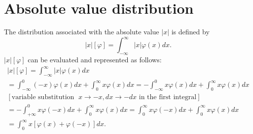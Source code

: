 %



\section{Absolute value distribution}


The distribution associated with the absolute value $\left|x\right|$ is defined by
 \begin{equation}
\left|x\right| \left[ \varphi \right] =
\int_{-\infty}^\infty  \left|x\right|  \varphi(x) dx.
 \end{equation}
$\left|x\right| \left[ \varphi \right]$
can be evaluated and represented as follows:
\begin{equation}
\begin{split}
\left|x\right| \left[ \varphi \right]
=
\int_{-\infty}^\infty  \left|x\right|  \varphi(x) dx
\\
=
\int_{-\infty}^0 (-x)  \varphi(x) dx
+
\int_{0}^\infty   x   \varphi(x) dx
=
-\int_{-\infty}^0  x   \varphi(x) dx
+
\int_{0}^\infty   x   \varphi(x) dx
\\
[\textrm{variable substitution }\; x\rightarrow -x, dx \rightarrow -dx \textrm{ in the first integral}]
\\
=
-\int_{+\infty}^0  x   \varphi(-x) dx
+
\int_{0}^\infty   x   \varphi(x) dx
=
\int_0^{\infty}  x   \varphi(-x) dx
+
\int_{0}^\infty   x   \varphi(x) dx
\\
=
\int_0^{\infty}  x   \left[ \varphi(x) + \varphi(-x) \right] dx .
\end{split}
\end{equation}

